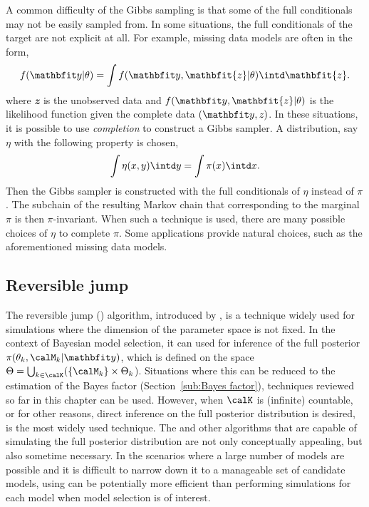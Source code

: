 A common difficulty of the Gibbs sampling is that some of the full
conditionals may not be easily sampled from. In some situations, the full
conditionals of the target are not explicit at all. For example, missing data
models are often in the form,
\begin{equation*}
  f(\data|\theta) = \int f(\data, \mathbfit{z}|\theta)\intd \mathbfit{z}.
\end{equation*}
where $\mathbfit{z}$ is the unobserved data and $f(\data,\mathbfit{z}|\theta)$
is the likelihood function given the complete data $(\data,\mathit{z})$. In
these situations, it is possible to use \emph{completion} to construct a Gibbs
sampler. A distribution, say $\eta$ with the following property is chosen,
\begin{equation}
  \int\eta(x,y)\intd y = \int\pi(x)\intd x.
\end{equation}
Then the Gibbs sampler is constructed with the full conditionals of $\eta$
instead of $\pi$. The subchain of the resulting Markov chain that
corresponding to the marginal $\pi$ is then $\pi$-invariant. When such a
technique is used, there are many possible choices of $\eta$ to complete
$\pi$. Some applications provide natural choices, such as the aforementioned
missing data models.

\subsection{Reversible jump \protect\mcmc}
\label{sub:Reversible jump mcmc}

The reversible jump \mcmc (\rjmcmc) algorithm, introduced by
\cite{Green:1995dg}, is a technique widely used for simulations where the
dimension of the parameter space is not fixed. In the context of Bayesian
model selection, it can used for inference of the full posterior
$\pi(\theta_k,\calM_k|\data)$, which is defined on the space $\Theta =
\bigcup_{k\in\calK}(\{\calM_k\}\times\Theta_k$). Situations where this can be
reduced to the estimation of the Bayes factor (Section~\ref{sub:Bayes
  factor}), techniques reviewed so far in this chapter can be used. However,
when $\calK$ is (infinite) countable, or for other reasons, direct inference
on the full posterior distribution is desired, \rjmcmc is the most widely used
technique. The \rjmcmc and other algorithms that are capable of simulating the
full posterior distribution are not only conceptually appealing, but also
sometime necessary. In the scenarios where a large number of models are
possible and it is difficult to narrow down it to a manageable set of
candidate models, using \rjmcmc can be potentially more efficient than
performing simulations for each model when model selection is of interest.

